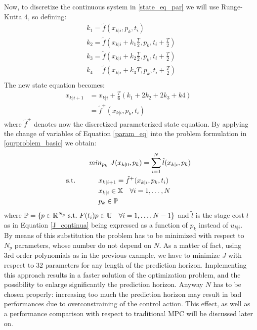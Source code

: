 Now, to discretize the continuous system in \ref{state_eq_par} we will use Runge-Kutta 4, so defining: 
\begin{equation*}
\begin{split}
    &k_1 = \tilde{f}(x_{k|i},p_k,t_i) \\
	&k_2 = \tilde{f}(x_{k|i}+k_1\frac{T}{2},p_k,t_i+\frac{T}{2}) \\
	&k_3 = \tilde{f}(x_{k|i}+k_2\frac{T}{2},p_k,t_i+\frac{T}{2})\\
	&k_4 = \tilde{f}(x_{k|i}+k_3T,p_k,t_i+\frac{T}{2})\\
\end{split}	
\end{equation*}
The new state equation becomes:  
\begin{equation}\label{state_eq_param}
\begin{split}
	x_{k|i+1}&=x_{k|i}+\frac{T}{6}(k_1+2k_2+2k_3+k4) \\
	&=\tilde{f}^+(x_{k|i},p_k,t_i)
\end{split}
\end{equation}
where $\tilde{f}^+$ denotes now the discretized parameterized state equation.
By applying the change of variables of Equation \ref{param_eq} into the problem formulation in \ref{ourproblem_basic} we obtain:
\begin{equation} \label{ourproblem_param}
\begin{split}
		& min_{p_k}\ J({x}_{k|0},p_k) = \sum_{i=1}^{N}\tilde{l}({x}_{k|i},p_k) \\
		\textnormal{s.t.}\qquad
		&\ \ \ \ x_{k|i+1}=\tilde{f}^+(x_{k|i},p_k,t_i) \\
		&\ \ \ \ {x}_{k|i} \in \mathbb{X}\quad \forall i=1,\dots, N  \\
		&\ \ \ \ p_k   \in \mathbb{P}\ \\
	\end{split}	
\end{equation}
where $\mathbb{P} = \lbrace p\in \mathbb{R}^{N_p}\ \textnormal{s.t.}\ F(t_i)p \in \mathbb{U}\quad \forall i = 1, \dots, N-1 \rbrace $ and $\tilde{l}$ is the stage cost $l$ as in Equation \ref{J_continua} being expressed as a function of $p_k$ instead of ${u}_{k|i}$. By means of this substitution the problem has to be minimized with respect to $N_p$ parameters, whose number do not depend on $N$. As a matter of fact, using 3rd order polynomials as in the previous example, we have to minimize $J$ with respect to $32$ parameters for any length of the prediction horizon. Implementing this approach results in a faster solution of the optimization problem, and the possibility to enlarge significantly the prediction horizon. Anyway $N$ has to be chosen properly: increasing too much the prediction horizon may result in bad performances due to overconstraining of the control action. This effect, as well as a performance comparison with respect to traditional MPC will be discussed later on.
